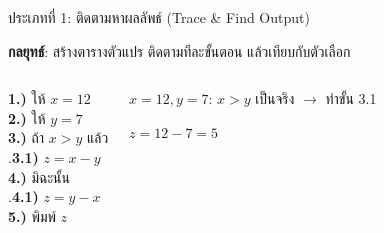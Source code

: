 \documentclass[11pt, aspectratio=169]{beamer}
\begin{document}
\begin{frame}{ประเภทที่ 1: ติดตามหาผลลัพธ์ (Trace \& Find Output)}
  \begin{explanation}
    \textbf{กลยุทธ์}: สร้างตารางตัวแปร ติดตามทีละขั้นตอน แล้วเทียบกับตัวเลือก
  \end{explanation}

  \begin{columns}[T]
      \begin{pseudobox}
        \textbf{1.)} ให้ $x = 12$ \\
        \textbf{2.)} ให้ $y = 7$ \\
        \textbf{3.)} ถ้า $x > y$ แล้ว \\
        .\qquad \textbf{3.1)} $z = x - y$ \\
        \textbf{4.)} มิฉะนั้น \\
        .\qquad \textbf{4.1)} $z = y - x$ \\
        \textbf{5.)} พิมพ์ $z$
      \end{pseudobox}
      \begin{solbox}[ติดตาม]
        $x=12, y=7$: $x>y$ เป็นจริง $\rightarrow$ ทำขั้น 3.1

        $z = 12-7 = 5$

      \end{solbox}
  \end{columns}
\end{frame}
\end{document}
